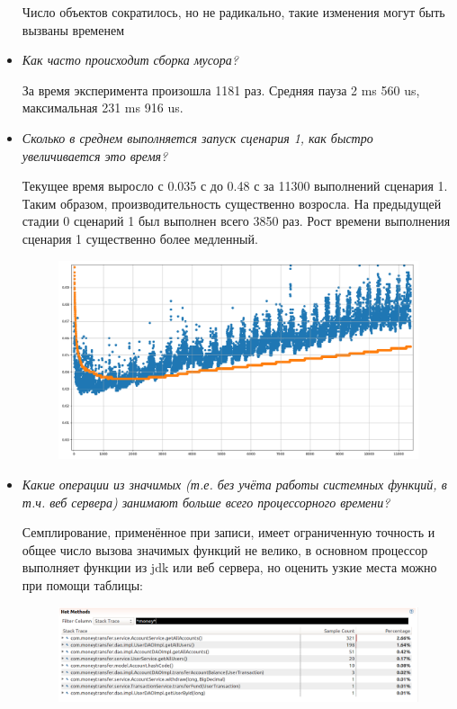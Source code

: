 \documentclass{article}
\begin{document}
\begin{itemize}
		Число объектов сократилось, но не радикально, такие изменения могут быть вызваны временем
				
		\item \textit{Как часто происходит сборка мусора?}
		
		За время эксперимента произошла 1181 раз. Средняя пауза 2 ms 560 us, максимальная 231 ms 916 us. 
		
		\item \textit{Сколько в среднем выполняется запуск сценария 1, как быстро увеличивается это время?}
		
		Текущее время выросло с 0.035 с до  0.48 с за 11300 выполнений сценария 1. 
		Таким образом, производительность существенно возросла. На предыдущей стадии 0 сценарий 1 был выполнен всего 3850 раз. 
		Рост времени выполнения сценария 1 существенно более медленный.
		
		\begin{figure}[h!] %
			\centering
			\includegraphics[width=0.95\linewidth]{img/stage_1/pyplot.png}
			\label{fig:pyplot1}
		\end{figure}
		
		\newpage
		\item \textit{Какие операции из значимых (т.е. без учёта работы системных функций, в т.ч. веб сервера) занимают больше всего процессорного времени?}
		
		Семплирование, применённое при записи, имеет ограниченную точность и общее число вызова значимых функций не велико, 
		в основном процессор выполняет функции из jdk или веб сервера, но оценить узкие места можно при помощи таблицы: 
		
		\begin{figure}[h!] %
			\centering
			\includegraphics[width=0.95\linewidth]{img/stage_1/hotmethods.png}
			\label{fig:hotmethods1}
		\end{figure}
		

\end{itemize}
\end{document}
